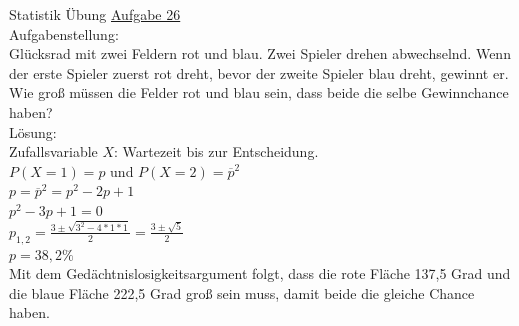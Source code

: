 \documentclass[12pt]{article} %
\newcommand{\aufgabe}[1]{{\huge Statistik Übung \underline{Aufgabe #1}}\\[3.5ex]  }
\begin{document}
\aufgabe{26}
Aufgabenstellung: \\
Glücksrad mit zwei Feldern rot und blau. Zwei Spieler drehen abwechselnd. 
Wenn der erste Spieler zuerst rot dreht, bevor der zweite Spieler blau dreht, gewinnt er. 
Wie groß müssen die Felder rot und blau sein, dass beide die selbe Gewinnchance haben? \\[0.5cm]
Lösung: \\
Zufallsvariable $X$: Wartezeit bis zur Entscheidung. \\
$P(X=1) = p$ und $P(X=2) = \overline{p}^2$\\
$p = \overline{p}^2 = p^2 - 2p + 1$\\
$p^2 - 3p +1 = 0$\\
$p_{1, 2} = \frac{3 \pm \sqrt{3^2 - 4 *1*1}}{2} = \frac{3 \pm \sqrt{5}}{2}$\\
$p = 38,2\%$\\[1ex]
Mit dem Gedächtnislosigkeitsargument folgt, dass die rote Fläche 137,5 Grad und die blaue Fläche 222,5 Grad groß sein muss, damit beide die gleiche Chance haben. \\
\end{document}
